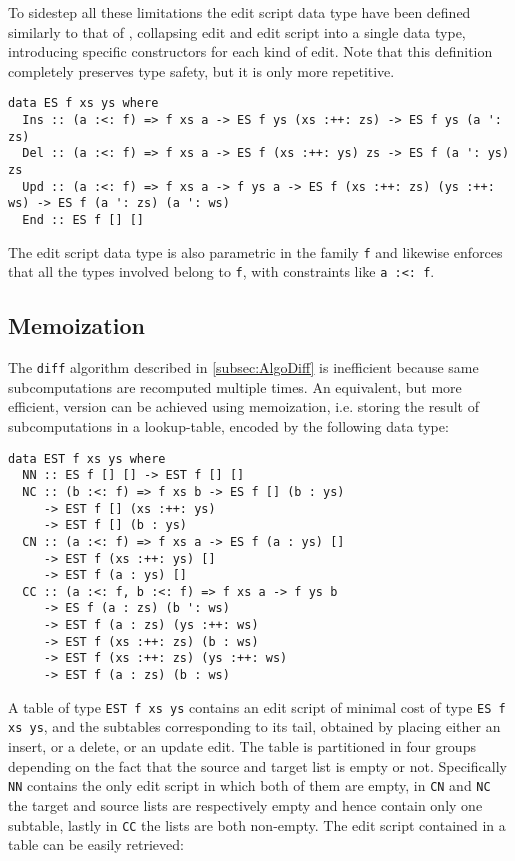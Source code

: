 \documentclass[../Thesis.tex]{subfiles}
\begin{document}
	To sidestep all these limitations the edit script data type have been defined 
	similarly to that of \cite{Lemp09}, collapsing edit and edit script into
	a single data type, introducing specific constructors for
	each kind of edit. Note that this definition completely preserves type safety,
	but it is only more repetitive.

\begin{verbatim}
data ES f xs ys where
  Ins :: (a :<: f) => f xs a -> ES f ys (xs :++: zs) -> ES f ys (a ': zs)
  Del :: (a :<: f) => f xs a -> ES f (xs :++: ys) zs -> ES f (a ': ys) zs
  Upd :: (a :<: f) => f xs a -> f ys a -> ES f (xs :++: zs) (ys :++: ws) -> ES f (a ': zs) (a ': ws)
  End :: ES f [] []
\end{verbatim}

	The edit script data type is also parametric in the family \texttt{f} 
	and likewise enforces that all the types involved belong to \texttt{f},
	with constraints like \texttt{a :<: f}. 

	\subsection{Memoization}
	The \texttt{diff} algorithm described in \ref{subsec:AlgoDiff} is inefficient 
	because same subcomputations are recomputed multiple times.
	An equivalent, but more efficient, version can be achieved using 
	memoization, i.e. storing the result of subcomputations in a lookup-table,
	encoded by the following data type:
	
\begin{verbatim}	
data EST f xs ys where
  NN :: ES f [] [] -> EST f [] []
  NC :: (b :<: f) => f xs b -> ES f [] (b : ys) 
     -> EST f [] (xs :++: ys) 
     -> EST f [] (b : ys)
  CN :: (a :<: f) => f xs a -> ES f (a : ys) [] 
     -> EST f (xs :++: ys) []
     -> EST f (a : ys) []
  CC :: (a :<: f, b :<: f) => f xs a -> f ys b 
     -> ES f (a : zs) (b ': ws) 
     -> EST f (a : zs) (ys :++: ws)
     -> EST f (xs :++: zs) (b : ws)
     -> EST f (xs :++: zs) (ys :++: ws)
     -> EST f (a : zs) (b : ws)
\end{verbatim}
	
	A table of type \texttt{EST f xs ys} contains an edit script
	of minimal cost of type \texttt{ES f xs ys}, and the subtables
	corresponding to its tail, obtained by placing either an insert, or
	a delete, or an update edit.
	The table is partitioned in four groups depending on the fact
	that the source and target list is empty or not.
	Specifically \texttt{NN} contains the only edit script in which both
	of them are empty, in \texttt{CN} and \texttt{NC} the target and source
	lists are respectively empty and hence contain only one subtable,
	lastly in \texttt{CC} the lists are both non-empty.
	The edit script contained in a table can be easily retrieved:
	
\end{document}
